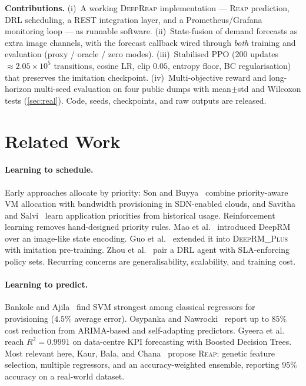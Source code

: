 \documentclass[runningheads]{llncs}
\newcommand{\reap}{\textsc{Reap}}
\newcommand{\deeprm}{\textsc{DeepRM\_Plus}}
\newcommand{\deepreap}{\textsc{DeepReap}}
\begin{document}
\textbf{Contributions.}
(i)~A working \deepreap{} implementation --- \reap{} prediction, DRL
scheduling, a REST integration layer, and a Prometheus/Grafana
monitoring loop --- as runnable software.
(ii)~State-fusion of demand forecasts as extra image channels, with the
forecast callback wired through \emph{both} training and evaluation
(proxy / oracle / zero modes).
(iii)~Stabilised PPO ($200$ updates $\approx2.05{\times}10^5$
transitions, cosine LR, clip $0.05$, entropy floor, BC regularisation)
that preserves the imitation checkpoint.
(iv)~Multi-objective reward and long-horizon multi-seed evaluation on
four public dumps with mean$\pm$std and Wilcoxon tests
(\cref{sec:real}). Code, seeds, checkpoints, and raw outputs are
released.

\section{Related Work}
\paragraph{Learning to schedule.} Early approaches allocate by
priority: Son and Buyya~\cite{son2019} combine priority-aware VM
allocation with bandwidth provisioning in SDN-enabled clouds, and
Savitha and Salvi~\cite{savitha2021} learn application priorities from
historical usage. Reinforcement learning removes hand-designed priority
rules. Mao et al.~\cite{mao2016} introduced DeepRM over an image-like
state encoding. Guo et al.~\cite{guo2021} extended it into \deeprm{}
with imitation pre-training. Zhou et al.~\cite{zhou2021} pair a DRL
agent with SLA-enforcing policy sets. Recurring concerns are
generalisability, scalability, and training cost.

\paragraph{Learning to predict.} Bankole and Ajila~\cite{bankole2013}
find SVM strongest among classical regressors for provisioning
($4.5\%$ average error). Osypanka and Nawrocki~\cite{osypanka2022,osypanka2023}
report up to $85\%$ cost reduction from ARIMA-based and self-adapting
predictors. Gyeera et al.~\cite{gyeera2023} reach $R^2=0.9991$ on
data-centre KPI forecasting with Boosted Decision Trees. Most relevant
here, Kaur, Bala, and Chana~\cite{kaur2019} propose \reap{}: genetic
feature selection, multiple regressors, and an accuracy-weighted
ensemble, reporting $95\%$ accuracy on a real-world dataset.
\end{document}
